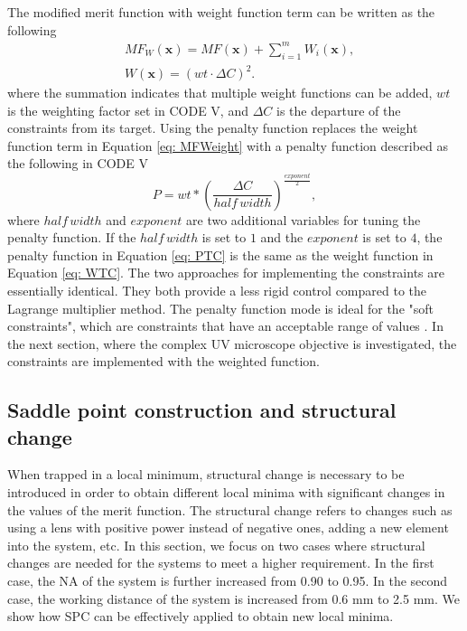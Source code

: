 The modified merit function with weight function term can be written as the following 
\setlength{\belowdisplayshortskip}{5pt}
\setlength{\abovedisplayshortskip}{5pt}
\begin{subequations} 
\begin{align}
& MF_{W}(\textbf{x})=MF(\textbf{x})+\sum_{i=1}^{m}W_i(\textbf{x}), \label{eq: MFWeight} \\
& W(\textbf{x})=(wt\cdot \Delta C)^2. \label{eq: WTC}
\end{align}
\end{subequations}
where the summation indicates that multiple weight functions can be added, $wt$ is the weighting factor set in CODE V, and $\Delta C$ is the departure of the constraints from its target. Using the penalty function replaces the weight function term in Equation \ref{eq: MFWeight} with a penalty function described as the following in CODE V
\setlength{\belowdisplayshortskip}{5pt}
\setlength{\abovedisplayshortskip}{5pt}
\begin{equation} \label{eq: PTC}
P = wt*(\frac{\Delta C}{half \, width})^{\frac{exponent}{2}},
\end{equation}where ${half \, width}$ and $exponent$ are two additional variables for tuning the penalty function. If the ${half \, width}$ is set to $1$ and the $exponent$ is set to $4$, the penalty function in Equation \ref{eq: PTC} is the same as the weight function in Equation \ref{eq: WTC}. The two approaches for implementing the constraints are essentially identical. They both provide a less rigid control compared to the Lagrange multiplier method. The penalty function mode is ideal for the "soft constraints", which are constraints that have an acceptable range of values \cite{codevmanual}. In the next section, where the complex UV microscope objective is investigated, the constraints are implemented with the weighted function.

\subsection{Saddle point construction and structural change}
When trapped in a local minimum, structural change is necessary to be introduced in order to obtain different local minima with significant changes in the values of the merit function. The structural change refers to changes such as using a lens with positive power instead of negative ones, adding a new element into the system, etc. In this section, we focus on two cases where structural changes are needed for the systems to meet a higher requirement. In the first case, the NA of the system is further increased from 0.90 to 0.95. In the second case, the working distance of the system is increased from 0.6 mm to 2.5 mm. We show how SPC can be effectively applied to obtain new local minima. 


